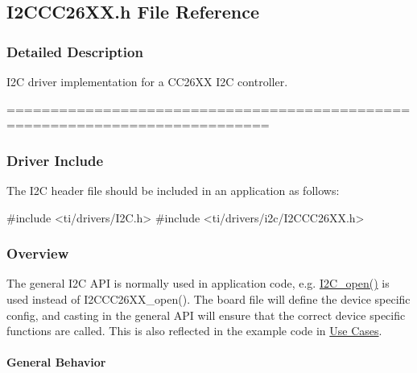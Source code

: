 \subsection{I2\+C\+C\+C26\+X\+X.\+h File Reference}
\label{_i2_c_c_c26_x_x_8h}


\subsubsection{Detailed Description}
I2\+C driver implementation for a C\+C26\+X\+X I2\+C controller. 

============================================================================

\subsubsection*{Driver Include}

The I2\+C header file should be included in an application as follows\+: 
\begin{DoxyCode}
\textcolor{preprocessor}{#include <ti/drivers/I2C.h>}
\textcolor{preprocessor}{#include <ti/drivers/i2c/I2CCC26XX.h>}
\end{DoxyCode}


\subsubsection*{Overview}

The general I2\+C A\+P\+I is normally used in application code, e.\+g. \hyperlink{_i2_c_8h_ae1aa99e1fee4517406018e10025cca0e}{I2\+C\+\_\+open()} is used instead of I2\+C\+C\+C26\+X\+X\+\_\+open(). The board file will define the device specific config, and casting in the general A\+P\+I will ensure that the correct device specific functions are called. This is also reflected in the example code in \hyperlink{_i2_c_c_c26_x_x_8h_I2C_USE_CASES}{Use Cases}.

\paragraph*{General Behavior}

